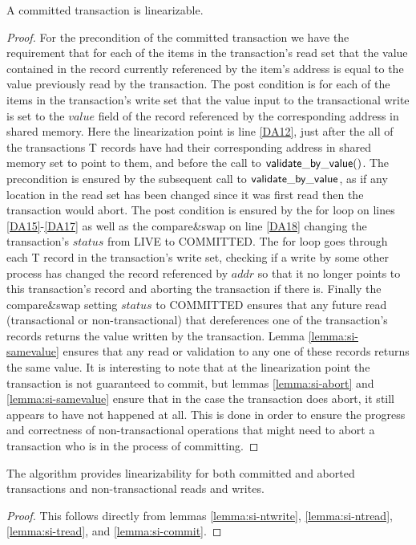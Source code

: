 \begin{lemma}
\label{lemma:si-commit}
A committed transaction is linearizable.
\end{lemma}
\begin{proof}
For the precondition of the committed transaction we have the requirement
that for each of the items in the transaction's read set that the value
contained in the record currently referenced by the item's address is equal to the value 
previously read by the transaction.
The post condition is for each of the items in the transaction's write set
that the value input to the transactional write is set to the $\mathit{value}$ field of the record
referenced by the corresponding address in shared memory.
Here the linearization point is line \ref{DA12}, just after the all of the transactions T records
have had their corresponding address in shared memory set to point to them, and before the call to
$\sf{validate\_by\_value}()$.
The precondition is ensured by the subsequent call to $\sf{validate\_by\_value}$,
as if any location in the read set has been changed since it was first read then
the transaction would abort.
The post condition is ensured by the for loop on lines \ref{DA15}-\ref{DA17} as well
as the compare\&swap on line \ref{DA18} changing the transaction's $\mathit{status}$
from LIVE to COMMITTED.
The for loop goes through each T record in the transaction's write set, checking
if a write by some other process has changed the record referenced by $\mathit{addr}$ so that it no longer points
to this transaction's record and aborting the transaction
if there is.
Finally the compare\&swap setting $\mathit{status}$ to COMMITTED ensures
that any future read (transactional or non-transactional) that dereferences one of
the transaction's records returns the value written by the transaction.
Lemma \ref{lemma:si-samevalue} ensures that any read or validation to any one of these
records returns the same value.
It is interesting to note that at the linearization point the transaction is not
guaranteed to commit, but lemmas \ref{lemma:si-abort} and \ref{lemma:si-samevalue}
ensure that in the case the transaction does abort, it still appears to have not happened
at all.
This is done in order to ensure the progress and correctness of non-transactional operations that might
need to abort a transaction who is in the process of committing.
\end{proof}



\begin{theorem}
\label{theorem:si-lin}
The algorithm provides linearizability for both committed and aborted transactions
and non-transactional reads and writes.
\end{theorem}
\begin{proof}
This follows directly from lemmas \ref{lemma:si-ntwrite}, \ref{lemma:si-ntread}, \ref{lemma:si-tread},
and \ref{lemma:si-commit}.
\end{proof}



